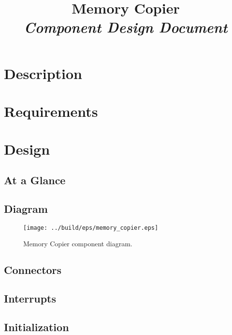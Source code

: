 



\title{\textbf{Memory Copier} \\
\large\textit{Component Design Document}}
\date{}
\maketitle

\section{Description}


\section{Requirements}


\section{Design}

\subsection{At a Glance}


\subsection{Diagram}
\begin{figure}[H]
  \texttt{[image: ../build/eps/memory\_copier.eps]}
  \caption{Memory Copier component diagram.}
\end{figure}

\subsection{Connectors}


\subsection{Interrupts}



\subsection{Initialization}


